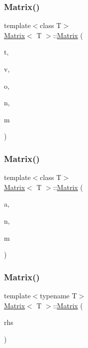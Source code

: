 \subsubsection{\texorpdfstring{Matrix()}{Matrix()}\hspace{0.1cm}{\footnotesize\ttfamily [5/7]}}
{\footnotesize\ttfamily template$<$class T$>$ \\
\mbox{\hyperlink{classMatrix}{Matrix}}$<$ T $>$\+::\mbox{\hyperlink{classMatrix}{Matrix}} (\begin{DoxyParamCaption}\item[{\mbox{\hyperlink{Array_8h_afb4b79601b9f07458ff37d2c507b3e6d}{M\+Type}}}]{t,  }\item[{const \mbox{\hyperlink{classVector}{Vector}}$<$ T $>$ \&}]{v,  }\item[{const T \&}]{o,  }\item[{const unsigned int}]{n,  }\item[{const unsigned int}]{m }\end{DoxyParamCaption})}

\mbox{\label{classMatrix_a33a507863c86bbc82e650054f1cc13b6}} 
\subsubsection{\texorpdfstring{Matrix()}{Matrix()}\hspace{0.1cm}{\footnotesize\ttfamily [6/7]}}
{\footnotesize\ttfamily template$<$class T$>$ \\
\mbox{\hyperlink{classMatrix}{Matrix}}$<$ T $>$\+::\mbox{\hyperlink{classMatrix}{Matrix}} (\begin{DoxyParamCaption}\item[{const T $\ast$}]{a,  }\item[{const unsigned int}]{n,  }\item[{const unsigned int}]{m }\end{DoxyParamCaption})}

\mbox{\label{classMatrix_a6a46705243036bfeee78fe2c84c54340}} 
\subsubsection{\texorpdfstring{Matrix()}{Matrix()}\hspace{0.1cm}{\footnotesize\ttfamily [7/7]}}
{\footnotesize\ttfamily template$<$typename T$>$ \\
\mbox{\hyperlink{classMatrix}{Matrix}}$<$ T $>$\+::\mbox{\hyperlink{classMatrix}{Matrix}} (\begin{DoxyParamCaption}\item[{const \mbox{\hyperlink{classMatrix}{Matrix}}$<$ T $>$ \&}]{rhs }\end{DoxyParamCaption})}

